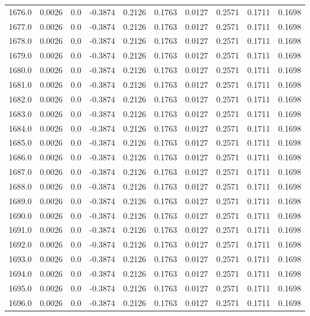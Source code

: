 \begin{longtable}{lrrrrrrrrr}
1676.0 & 0.0026 & 0.0 & -0.3874 & 0.2126 & 0.1763 & 0.0127 & 0.2571 & 0.1711 & 0.1698 \\
1677.0 & 0.0026 & 0.0 & -0.3874 & 0.2126 & 0.1763 & 0.0127 & 0.2571 & 0.1711 & 0.1698 \\
1678.0 & 0.0026 & 0.0 & -0.3874 & 0.2126 & 0.1763 & 0.0127 & 0.2571 & 0.1711 & 0.1698 \\
1679.0 & 0.0026 & 0.0 & -0.3874 & 0.2126 & 0.1763 & 0.0127 & 0.2571 & 0.1711 & 0.1698 \\
1680.0 & 0.0026 & 0.0 & -0.3874 & 0.2126 & 0.1763 & 0.0127 & 0.2571 & 0.1711 & 0.1698 \\
1681.0 & 0.0026 & 0.0 & -0.3874 & 0.2126 & 0.1763 & 0.0127 & 0.2571 & 0.1711 & 0.1698 \\
1682.0 & 0.0026 & 0.0 & -0.3874 & 0.2126 & 0.1763 & 0.0127 & 0.2571 & 0.1711 & 0.1698 \\
1683.0 & 0.0026 & 0.0 & -0.3874 & 0.2126 & 0.1763 & 0.0127 & 0.2571 & 0.1711 & 0.1698 \\
1684.0 & 0.0026 & 0.0 & -0.3874 & 0.2126 & 0.1763 & 0.0127 & 0.2571 & 0.1711 & 0.1698 \\
1685.0 & 0.0026 & 0.0 & -0.3874 & 0.2126 & 0.1763 & 0.0127 & 0.2571 & 0.1711 & 0.1698 \\
1686.0 & 0.0026 & 0.0 & -0.3874 & 0.2126 & 0.1763 & 0.0127 & 0.2571 & 0.1711 & 0.1698 \\
1687.0 & 0.0026 & 0.0 & -0.3874 & 0.2126 & 0.1763 & 0.0127 & 0.2571 & 0.1711 & 0.1698 \\
1688.0 & 0.0026 & 0.0 & -0.3874 & 0.2126 & 0.1763 & 0.0127 & 0.2571 & 0.1711 & 0.1698 \\
1689.0 & 0.0026 & 0.0 & -0.3874 & 0.2126 & 0.1763 & 0.0127 & 0.2571 & 0.1711 & 0.1698 \\
1690.0 & 0.0026 & 0.0 & -0.3874 & 0.2126 & 0.1763 & 0.0127 & 0.2571 & 0.1711 & 0.1698 \\
1691.0 & 0.0026 & 0.0 & -0.3874 & 0.2126 & 0.1763 & 0.0127 & 0.2571 & 0.1711 & 0.1698 \\
1692.0 & 0.0026 & 0.0 & -0.3874 & 0.2126 & 0.1763 & 0.0127 & 0.2571 & 0.1711 & 0.1698 \\
1693.0 & 0.0026 & 0.0 & -0.3874 & 0.2126 & 0.1763 & 0.0127 & 0.2571 & 0.1711 & 0.1698 \\
1694.0 & 0.0026 & 0.0 & -0.3874 & 0.2126 & 0.1763 & 0.0127 & 0.2571 & 0.1711 & 0.1698 \\
1695.0 & 0.0026 & 0.0 & -0.3874 & 0.2126 & 0.1763 & 0.0127 & 0.2571 & 0.1711 & 0.1698 \\
1696.0 & 0.0026 & 0.0 & -0.3874 & 0.2126 & 0.1763 & 0.0127 & 0.2571 & 0.1711 & 0.1698 \\

\end{longtable}
